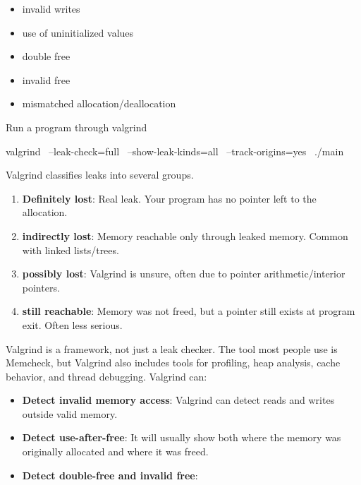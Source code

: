 \documentclass{report}
\begin{document}
\begin{itemize}
\begin{itemize}
                    \item invalid writes
                    \item use of uninitialized values
                    \item double free
                    \item invalid free
                    \item mismatched allocation/deallocation
                \end{itemize}
                Run a program through valgrind
                \bigbreak \noindent 
                \begin{bashcode}
                    valgrind \
                        --leak-check=full \
                        --show-leak-kinds=all \
                        --track-origins=yes \
                        ./main
                \end{bashcode}
                \bigbreak \noindent 
                Valgrind classifies leaks into several groups.
                \begin{enumerate}
                    \item \textbf{Definitely lost}:	Real leak. Your program has no pointer left to the allocation.
                    \item \textbf{indirectly lost}:	Memory reachable only through leaked memory. Common with linked lists/trees.
                    \item \textbf{possibly lost}:	Valgrind is unsure, often due to pointer arithmetic/interior pointers.
                    \item \textbf{still reachable}:	Memory was not freed, but a pointer still exists at program exit. Often less serious.
                \end{enumerate}
                Valgrind is a framework, not just a leak checker. The tool most people use is Memcheck, but Valgrind also includes tools for profiling, heap analysis, cache behavior, and thread debugging. Valgrind can:
                \begin{itemize}
                    \item \textbf{Detect invalid memory access}: Valgrind can detect reads and writes outside valid memory.    
                    \item \textbf{Detect use-after-free}: It will usually show both where the memory was originally allocated and where it was freed.
                    \item \textbf{Detect double-free and invalid free}:

\end{itemize}
\end{itemize}
\end{document}
